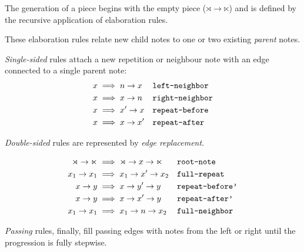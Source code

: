 \documentclass[12pt,a4paper,twoside,openany]{report} \usepackage[pdfborder={0 0 0}]{hyperref}    %
\theoremstyle{definition} \newtheorem{definition}{Definition}[section]
\begin{document}
The generation of a piece begins with the empty piece ($\rtimes \to \ltimes$) and is defined by the recursive
application of elaboration rules.

These elaboration rules relate new child notes to one or two existing \textit{parent} notes.

\textit{Single-sided} rules attach a new repetition or neighbour note with an edge connected to a single parent note: 
\begin{equation}
  \begin{aligned} 
    x &\implies n \to x && \text{\texttt{left-neighbor}} \label{eq:leftNeighbor} \\ 
    x &\implies x \to n && \text{\texttt{right-neighbor}} \label{eq:rightNeighbor} \\ 
    x &\implies x' \to x && \text{\texttt{repeat-before}} \label{eq:repeatBefore} \\ 
    x &\implies x \to x' && \text{\texttt{repeat-after}} \label{eq:repeatAfter} \\ 
  \end{aligned}
\end{equation}

\textit{Double-sided} rules are represented by \textit{edge replacement}. 

\begin{equation} 
  \begin{aligned}
    \rtimes \to \ltimes &\implies \rtimes \to x \to \ltimes && \text{\texttt{root-note}} \label{eq:rootNote} \\ 
    x_1 \to x_1 &\implies x_1 \to x' \to x_2 && \text{\texttt{full-repeat}} \label{eq:full-repeat}\\
    x \to y &\implies x \to y' \to y && \text{\texttt{repeat-before'}} \label{eq:repeatBefore'}\\
    x \to y &\implies x \to x' \to y && \text{\texttt{repeat-after'}} \label{eq:repeatAfter'}\\ 
    x_1 \to x_1 &\implies x_1 \to n \to x_2 && \text{\texttt{full-neighbor}} \label{eq:full-neighbor}\\
\end{aligned} 
\label{eq:doublesidedinnerop} \end{equation}

\textit{Passing} rules, finally, fill passing edges with notes from the left or right until the progression is fully stepwise.
\end{document}
